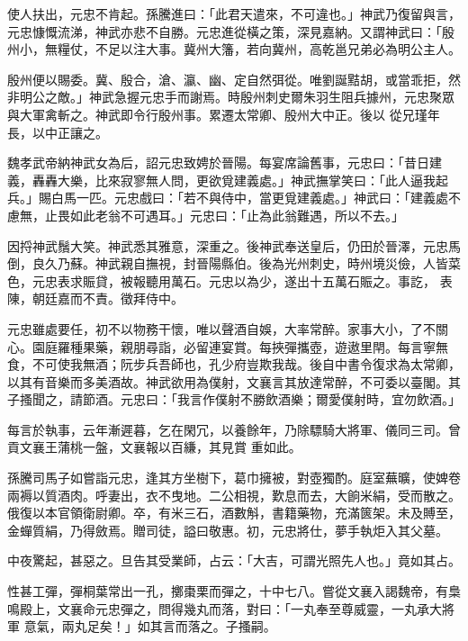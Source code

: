 \begin{pinyinscope}
 使人扶出，元忠不肯起。孫騰進曰：「此君天遣來，不可違也。」神武乃復留與言，元忠慷慨流涕，神武亦悲不自勝。元忠進從橫之策，深見嘉納。又謂神武曰：「殷州小，無糧仗，不足以注大事。冀州大籓，若向冀州，高乾邕兄弟必為明公主人。



 殷州便以賜委。冀、殷合，滄、瀛、幽、定自然弭從。唯劉誕黠胡，或當乖拒，然非明公之敵。」神武急握元忠手而謝焉。時殷州刺史爾朱羽生阻兵據州，元忠聚眾與大軍禽斬之。神武即令行殷州事。累遷太常卿、殷州大中正。後以
 從兄瑾年長，以中正讓之。



 魏孝武帝納神武女為后，詔元忠致娉於晉陽。每宴席論舊事，元忠曰：「昔日建義，轟轟大樂，比來寂寥無人問，更欲覓建義處。」神武撫掌笑曰：「此人逼我起兵。」賜白馬一匹。元忠戲曰：「若不與侍中，當更覓建義處。」神武曰：「建義處不慮無，止畏如此老翁不可遇耳。」元忠曰：「止為此翁難遇，所以不去。」



 因捋神武鬚大笑。神武悉其雅意，深重之。後神武奉送皇后，仍田於晉澤，元忠馬倒，良久乃蘇。神武親自撫視，封晉陽縣伯。後為光州刺史，時州境災儉，人皆菜色，元忠表求賑貸，被報聽用萬石。元忠以為少，遂出十五萬石賑之。事訖，
 表陳，朝廷嘉而不責。徵拜侍中。



 元忠雖處要任，初不以物務干懷，唯以聲酒自娛，大率常醉。家事大小，了不關心。園庭羅種果藥，親朋尋詣，必留連宴賞。每挾彈攜壺，遊遨里閈。每言寧無食，不可使我無酒；阮步兵吾師也，孔少府豈欺我哉。後自中書令復求為太常卿，以其有音樂而多美酒故。神武欲用為僕射，文襄言其放達常醉，不可委以臺閣。其子搔聞之，請節酒。元忠曰：「我言作僕射不勝飲酒樂；爾愛僕射時，宜勿飲酒。」



 每言於執事，云年漸遲暮，乞在閑冗，以養餘年，乃除驃騎大將軍、儀同三司。曾貢文襄王蒲桃一盤，文襄報以百縑，其見賞
 重如此。



 孫騰司馬子如嘗詣元忠，逢其方坐樹下，葛巾擁被，對壺獨酌。庭室蕪曠，使婢卷兩褥以質酒肉。呼妻出，衣不曳地。二公相視，歎息而去，大餉米絹，受而散之。俄復以本官領衛尉卿。卒，有米三石，酒數斛，書籍藥物，充滿篋架。未及賻至，金蟬質絹，乃得斂焉。贈司徒，謚曰敬惠。初，元忠將仕，夢手執炬入其父墓。



 中夜驚起，甚惡之。旦告其受業師，占云：「大吉，可謂光照先人也。」竟如其占。



 性甚工彈，彈桐葉常出一孔，擲棗栗而彈之，十中七八。嘗從文襄入謁魏帝，有梟鳴殿上，文襄命元忠彈之，問得幾丸而落，對曰：「一丸奉至尊威靈，一丸承大將軍
 意氣，兩丸足矣！」如其言而落之。子搔嗣。




\end{pinyinscope}
